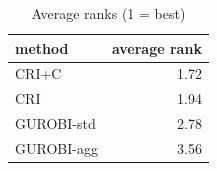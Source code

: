 \begin{table}[htbp]
\centering
\small
\caption{Average ranks (1 = best)}
\label{tab:E3_long_runs_b600_ranks}
\begin{tabular}{lr}
\toprule
method & average rank \\
\midrule
CRI+C & 1.72 \\
CRI & 1.94 \\
GUROBI-std & 2.78 \\
GUROBI-agg & 3.56 \\
\bottomrule
\end{tabular}
\end{table}

